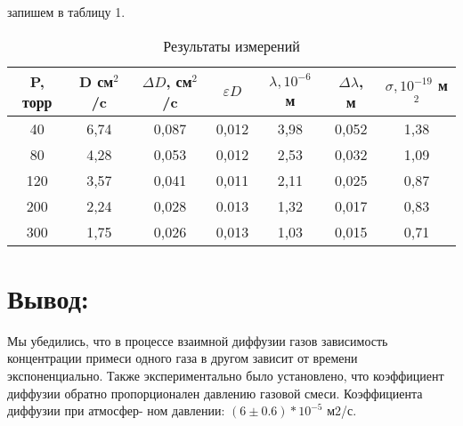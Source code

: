 \documentclass[a4paper,12pt]{article}
\theoremstyle{plain} %
\theoremstyle{definition} %
\theoremstyle{remark} %
\begin{document}
    запишем в таблицу 1.
    \begin{table}[!h]
        \begin{center}
            \begin{tabular}{|c|c|c|c|c|c|c|}
            \hline
            P, торр	&	D см$^2$/c	&	$\Delta D$,  см$^2$/c	&   $\varepsilon D$  &	$\lambda, 10^{-6}$ м	&	$\Delta \lambda$, м	&	$\sigma, 10^{-19}$ м$^2$	 \\
            \hline
            40	&	6,74	&	0,087	&   0,012   &	3,98	&	0,052	&	1,38	\\
            80	&	4,28	&	0,053	&   0,012   &	2,53	&	0,032	&	1,09	\\
            120	&	3,57	&	0,041	&   0,011   &	2,11	&	0,025	&	0,87	\\
            200	&	2,24	&	0,028	&   0.013   &	1,32	&	0,017	&	0,83	\\
            300	&	1,75	&	0,026	&   0,013   &	1,03	&	0,015	&	0,71	\\
            \hline
            \end{tabular}
        \caption{ Результаты измерений}
        \end{center}
    \end{table}
    
    \section{Вывод:}
    
        Мы убедились, что в процессе взаимной диффузии газов зависимость концентрации примеси одного газа в другом зависит от времени экспоненциально. Также экспериментально было установлено, что коэффициент диффузии обратно пропорционален давлению газовой смеси. Коэффициента диффузии при атмосфер- ном давлении: $(6 \pm 0.6) * 10 ^ {-5}$ м2/с.
    
\end{document}
